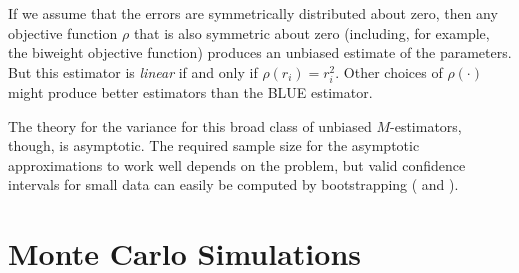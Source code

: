 \documentclass[12pt]{article}
\begin{document}
If we assume that the errors are symmetrically distributed about zero, then any objective function $\rho$ that is also symmetric about zero (including, for example, the biweight objective function) produces an unbiased estimate of the parameters. 
But this estimator is \textit{linear} if and only if $\rho(r_i) = r_i^2$. Other choices of $\rho(\cdot)$ might produce better estimators than the BLUE estimator.  

The theory for the variance for this broad class of unbiased $M$-estimators, though, is asymptotic. 
The required sample size for the asymptotic approximations to work well depends on the problem, but valid confidence intervals for small data can easily be computed by bootstrapping (\citealt{Efron1981} and \citealt{MooneyDuval1993}). 

\section*{Monte Carlo Simulations}
\end{document}
